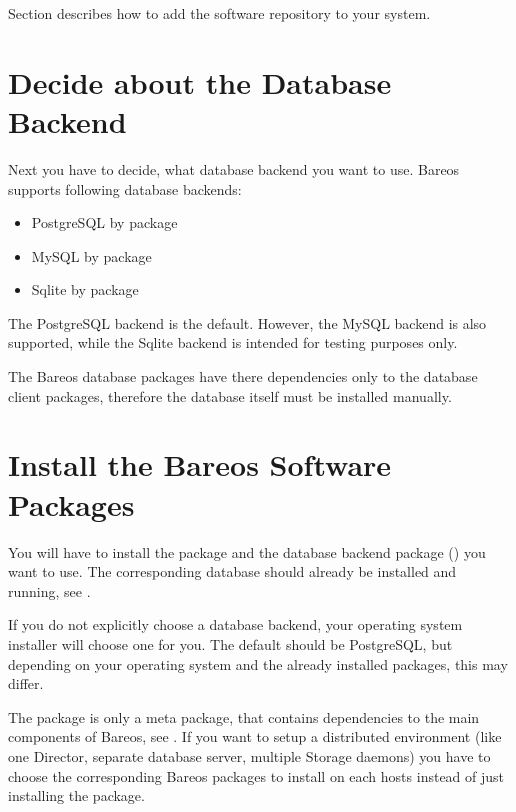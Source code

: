 Section  describes how to add the software repository to your system.


\section{Decide about the Database Backend}
    \label{sec:ChooseDatabaseBackend}

Next you have to decide, what database backend you want to use.
Bareos supports following database backends:
\begin{itemize}
    \item PostgreSQL by package 
    \item MySQL by package 
    \item Sqlite by package  \\
\end{itemize}

The PostgreSQL backend is the default.
However, the MySQL backend is also supported,
while the Sqlite backend is intended for testing purposes only.

The Bareos database packages have there dependencies only to the database client packages, 
therefore the database itself must be installed manually.


\section{Install the Bareos Software Packages}
    \label{sec:InstallBareosPackages}

You will have to install the package  
and the database backend package () you want to use.
The corresponding database should already be installed and running, see .

If you do not explicitly choose a database backend, your operating system installer will choose one for you.
The default should be PostgreSQL, but depending on your operating system and the already installed packages, 
this may differ.

The package  is only a meta package, that contains dependencies to the main components of Bareos, see . 
If you want to setup a distributed environment (like one Director, separate database server, multiple Storage daemons)
you have to choose the corresponding Bareos packages to install on each hosts instead of just installing the  package.



